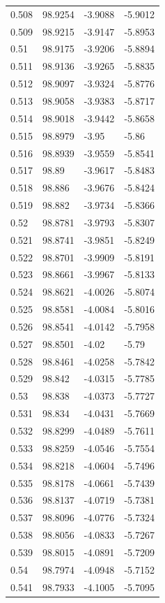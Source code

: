 \begin{tabular}{llll}
0.508 & 98.9254 & -3.9088 & -5.9012 \\
0.509 & 98.9215 & -3.9147 & -5.8953 \\
0.51 & 98.9175 & -3.9206 & -5.8894 \\
0.511 & 98.9136 & -3.9265 & -5.8835 \\
0.512 & 98.9097 & -3.9324 & -5.8776 \\
0.513 & 98.9058 & -3.9383 & -5.8717 \\
0.514 & 98.9018 & -3.9442 & -5.8658 \\
0.515 & 98.8979 & -3.95 & -5.86 \\
0.516 & 98.8939 & -3.9559 & -5.8541 \\
0.517 & 98.89 & -3.9617 & -5.8483 \\
0.518 & 98.886 & -3.9676 & -5.8424 \\
0.519 & 98.882 & -3.9734 & -5.8366 \\
0.52 & 98.8781 & -3.9793 & -5.8307 \\
0.521 & 98.8741 & -3.9851 & -5.8249 \\
0.522 & 98.8701 & -3.9909 & -5.8191 \\
0.523 & 98.8661 & -3.9967 & -5.8133 \\
0.524 & 98.8621 & -4.0026 & -5.8074 \\
0.525 & 98.8581 & -4.0084 & -5.8016 \\
0.526 & 98.8541 & -4.0142 & -5.7958 \\
0.527 & 98.8501 & -4.02 & -5.79 \\
0.528 & 98.8461 & -4.0258 & -5.7842 \\
0.529 & 98.842 & -4.0315 & -5.7785 \\
0.53 & 98.838 & -4.0373 & -5.7727 \\
0.531 & 98.834 & -4.0431 & -5.7669 \\
0.532 & 98.8299 & -4.0489 & -5.7611 \\
0.533 & 98.8259 & -4.0546 & -5.7554 \\
0.534 & 98.8218 & -4.0604 & -5.7496 \\
0.535 & 98.8178 & -4.0661 & -5.7439 \\
0.536 & 98.8137 & -4.0719 & -5.7381 \\
0.537 & 98.8096 & -4.0776 & -5.7324 \\
0.538 & 98.8056 & -4.0833 & -5.7267 \\
0.539 & 98.8015 & -4.0891 & -5.7209 \\
0.54 & 98.7974 & -4.0948 & -5.7152 \\
0.541 & 98.7933 & -4.1005 & -5.7095 \\

\end{tabular}

